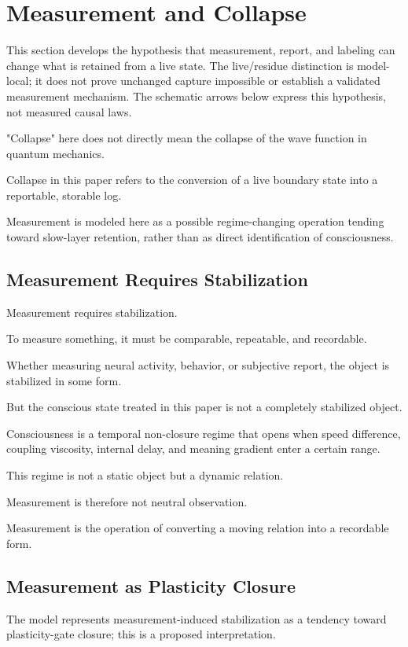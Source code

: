\section{Measurement and Collapse}


This section develops the hypothesis that measurement, report, and labeling can change what is retained from a live state. The live/residue distinction is model-local; it does not prove unchanged capture impossible or establish a validated measurement mechanism. The schematic arrows below express this hypothesis, not measured causal laws.

"Collapse" here does not directly mean the collapse of the wave function in quantum mechanics.

Collapse in this paper refers to the conversion of a live boundary state into a reportable, storable log.

Measurement is modeled here as a possible regime-changing operation tending toward slow-layer retention, rather than as direct identification of consciousness.

\subsection{Measurement Requires Stabilization}


Measurement requires stabilization.

To measure something, it must be comparable, repeatable, and recordable.

Whether measuring neural activity, behavior, or subjective report, the object is stabilized in some form.

But the conscious state treated in this paper is not a completely stabilized object.

Consciousness is a temporal non-closure regime that opens when speed difference, coupling viscosity, internal delay, and meaning gradient enter a certain range.

This regime is not a static object but a dynamic relation.

Measurement is therefore not neutral observation.

Measurement is the operation of converting a moving relation into a recordable form.

\subsection{Measurement as Plasticity Closure}


The model represents measurement-induced stabilization as a tendency toward plasticity-gate closure; this is a proposed interpretation.

